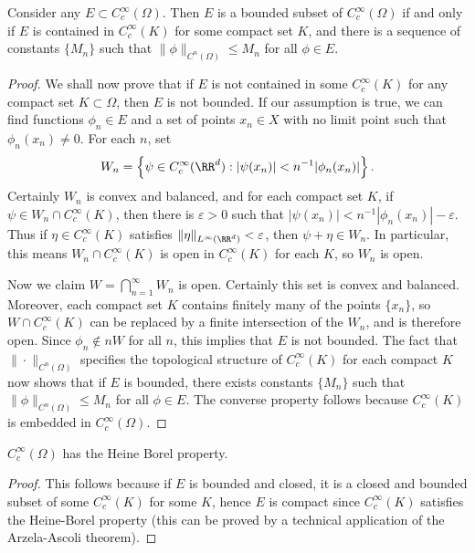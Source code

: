 \begin{theorem}
    Consider any $E \subset C_c^\infty(\Omega)$. Then $E$ is a bounded subset of $C_c^\infty(\Omega)$ if and only if $E$ is contained in $C_c^\infty(K)$ for some compact set $K$, and there is a sequence of constants $\{ M_n \}$ such that $\| \phi \|_{C^n(\Omega)} \leq M_n$ for all $\phi \in E$.
\end{theorem}
\begin{proof}
    We shall now prove that if $E$ is not contained in some $C_c^\infty(K)$ for any compact set $K \subset \Omega$, then $E$ is not bounded. If our assumption is true, we can find functions $\phi_n \in E$ and a set of points $x_n \in X$ with no limit point such that $\phi_n(x_n) \neq 0$. For each $n$, set
    \[ W_n = \left\{ \psi \in C_c^\infty(\RR^d): |\psi(x_n)| < n^{-1} |\phi_n(x_n)| \right\}. \]
    Certainly $W_n$ is convex and balanced, and for each compact set $K$, if $\psi \in W_n \cap C_c^\infty(K)$, then there is $\varepsilon > 0$ such that $|\psi(x_n)| < n^{-1} |\phi_n(x_n)| - \varepsilon$. Thus if $\eta \in C_c^\infty(K)$ satisfies $\| \eta \|_{L^\infty(\RR^d)} < \varepsilon$, then $\psi + \eta \in W_n$. In particular, this means $W_n \cap C_c^\infty(K)$ is open in $C_c^\infty(K)$ for each $K$, so $W_n$ is open.

    Now we claim $W = \bigcap_{n = 1}^\infty W_n$ is open. Certainly this set is convex and balanced. Moreover, each compact set $K$ contains finitely many of the points $\{ x_n \}$, so $W \cap C_c^\infty(K)$ can be replaced by a finite intersection of the $W_n$, and is therefore open. Since $\phi_n \not \in nW$ for all $n$, this implies that $E$ is not bounded. The fact that $\| \cdot \|_{C^n(\Omega)}$ specifies the topological structure of $C_c^\infty(K)$ for each compact $K$ now shows that if $E$ is bounded, there exists constants $\{ M_n \}$ such that $\| \phi \|_{C^n(\Omega)} \leq M_n$ for all $\phi \in E$. The converse property follows because $C_c^\infty(K)$ is embedded in $C_c^\infty(\Omega)$.
\end{proof}

\begin{corollary}
    $C_c^\infty(\Omega)$ has the Heine Borel property.
\end{corollary}
\begin{proof}
    This follows because if $E$ is bounded and closed, it is a closed and bounded subset of some $C_c^\infty(K)$ for some $K$, hence $E$ is compact since $C_c^\infty(K)$ satisfies the Heine-Borel property (this can be proved by a technical application of the Arzela-Ascoli theorem).
\end{proof}

